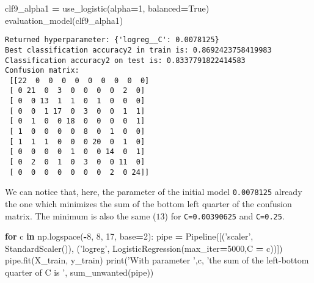 \documentclass[10pt,a4paper]{article}
\newenvironment{Shaded}{\begin{snugshade}}{\end{snugshade}}
\newcommand{\BuiltInTok}[1]{#1}
\newcommand{\ControlFlowTok}[1]{\textcolor[rgb]{0.13,0.29,0.53}{\textbf{#1}}}
\newcommand{\DecValTok}[1]{\textcolor[rgb]{0.00,0.00,0.81}{#1}}
\newcommand{\KeywordTok}[1]{\textcolor[rgb]{0.13,0.29,0.53}{\textbf{#1}}}
\newcommand{\NormalTok}[1]{#1}
\newcommand{\OperatorTok}[1]{\textcolor[rgb]{0.81,0.36,0.00}{\textbf{#1}}}
\newcommand{\StringTok}[1]{\textcolor[rgb]{0.31,0.60,0.02}{#1}}
\newcommand{\VariableTok}[1]{\textcolor[rgb]{0.00,0.00,0.00}{#1}}
\theoremstyle{break}
\begin{document}
\begin{Shaded}
\begin{Highlighting}[]
\NormalTok{clf9_alpha1 }\OperatorTok{=}\NormalTok{ use_logistic(alpha}\OperatorTok{=}\DecValTok{1}\NormalTok{, balanced}\OperatorTok{=}\VariableTok{True}\NormalTok{)}
\NormalTok{evaluation_model(clf9_alpha1)}
\end{Highlighting}
\end{Shaded}

\begin{verbatim}
Returned hyperparameter: {'logreg__C': 0.0078125}
Best classification accuracy2 in train is: 0.8692423758419983
Classification accuracy2 on test is: 0.8337791822414583
Confusion matrix: 
 [[22  0  0  0  0  0  0  0  0  0]
 [ 0 21  0  3  0  0  0  0  2  0]
 [ 0  0 13  1  1  0  1  0  0  0]
 [ 0  0  1 17  0  3  0  0  1  1]
 [ 0  1  0  0 18  0  0  0  0  1]
 [ 1  0  0  0  0  8  0  1  0  0]
 [ 1  1  1  0  0  0 20  0  1  0]
 [ 0  0  0  0  1  0  0 14  0  1]
 [ 0  2  0  1  0  3  0  0 11  0]
 [ 0  0  0  0  0  0  0  2  0 24]]
\end{verbatim}

We can notice that, here, the parameter of the initial model \texttt{0.0078125} already the one which minimizes the sum of the bottom left quarter of the confusion matrix. The minimum is also the same (\(13\)) for \texttt{C=0.00390625} and \texttt{C=0.25}.

\begin{Shaded}
\begin{Highlighting}[]
\ControlFlowTok{for}\NormalTok{ c }\KeywordTok{in}\NormalTok{ np.logspace(}\OperatorTok{-}\DecValTok{8}\NormalTok{, }\DecValTok{8}\NormalTok{, }\DecValTok{17}\NormalTok{, base}\OperatorTok{=}\DecValTok{2}\NormalTok{):}
\NormalTok{    pipe }\OperatorTok{=}\NormalTok{ Pipeline([(}\StringTok{'scaler'}\NormalTok{, StandardScaler()), (}\StringTok{'logreg'}\NormalTok{, LogisticRegression(max_iter}\OperatorTok{=}\DecValTok{5000}\NormalTok{,C }\OperatorTok{=}\NormalTok{ c))])}
\NormalTok{    pipe.fit(X_train, y_train)}
    \BuiltInTok{print}\NormalTok{(}\StringTok{'With parameter '}\NormalTok{,c, }\StringTok{'the sum of the left-bottom quarter of C is '}\NormalTok{, sum_unwanted(pipe))}
\end{Highlighting}
\end{Shaded}
\end{document}
